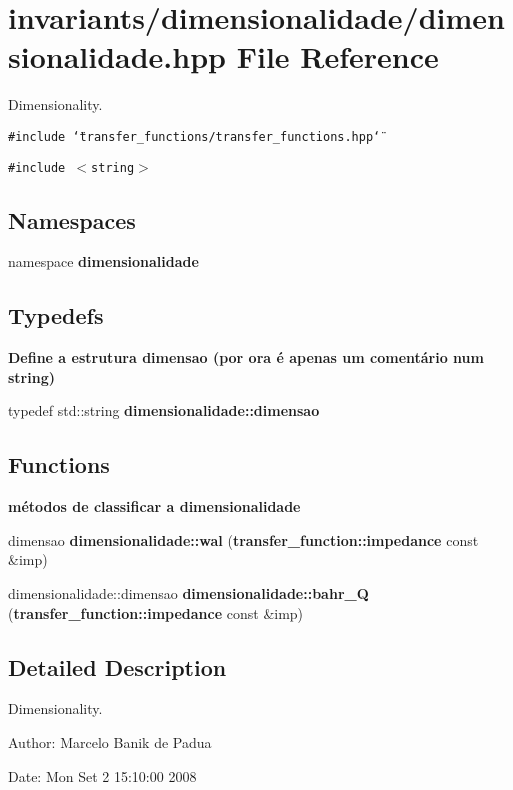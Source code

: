 \section{invariants/dimensionalidade/dimensionalidade.hpp File Reference}
\label{dimensionalidade_8hpp}
Dimensionality. 

{\tt \#include \char`\"{}transfer\_\-functions/transfer\_\-functions.hpp\char`\"{}}\par
{\tt \#include $<$string$>$}\par
\subsection*{Namespaces}
\begin{CompactItemize}
\item 
namespace {\bf dimensionalidade}
\end{CompactItemize}
\subsection*{Typedefs}
\begin{Indent}{\bf Define a estrutura dimensao (por ora é apenas um comentário num string)}\par
\begin{CompactItemize}
\item 
typedef std::string \textbf{dimensionalidade::dimensao}\label{namespacedimensionalidade_66bf625363c99879e8ea88ca4ba6434b}

\end{CompactItemize}
\end{Indent}
\subsection*{Functions}
\begin{Indent}{\bf métodos de classificar a dimensionalidade}\par
\begin{CompactItemize}
\item 
dimensao \textbf{dimensionalidade::wal} ({\bf transfer\_\-function::impedance} const \&imp)\label{namespacedimensionalidade_2b370cd9cb66cc02a2085328a538b26e}

\item 
dimensionalidade::dimensao \textbf{dimensionalidade::bahr\_\-Q} ({\bf transfer\_\-function::impedance} const \&imp)\label{namespacedimensionalidade_0f67f5f952cb6304f1fba1ea40db778f}

\end{CompactItemize}
\end{Indent}


\subsection{Detailed Description}
Dimensionality. 

\begin{Desc}
\item[Author:]Marcelo Banik de Padua \end{Desc}
\begin{Desc}
\item[Date:]Mon Set 2 15:10:00 2008 \end{Desc}

